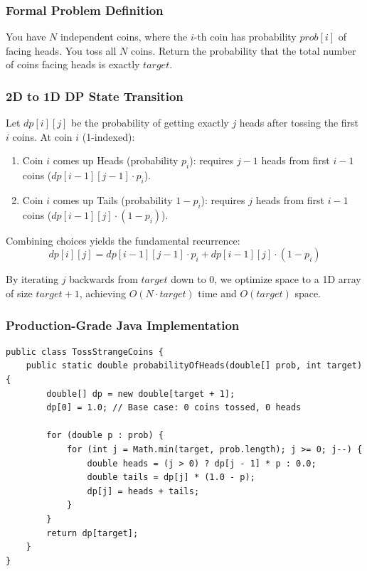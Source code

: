 \documentclass[10pt,journal,compsoc,onecolumn]{IEEEtran}
\begin{document}
\subsubsection{Formal Problem Definition}
You have $N$ independent coins, where the $i$-th coin has probability $prob[i]$ of facing heads. You toss all $N$ coins. Return the probability that the total number of coins facing heads is exactly $target$.

\subsubsection{2D to 1D DP State Transition}
Let $dp[i][j]$ be the probability of getting exactly $j$ heads after tossing the first $i$ coins.
At coin $i$ (1-indexed):
\begin{enumerate}
    \item Coin $i$ comes up Heads (probability $p_i$): requires $j-1$ heads from first $i-1$ coins ($dp[i-1][j-1] \cdot p_i$).
    \item Coin $i$ comes up Tails (probability $1 - p_i$): requires $j$ heads from first $i-1$ coins ($dp[i-1][j] \cdot (1 - p_i)$).
\end{enumerate}

Combining choices yields the fundamental recurrence:
\begin{equation}
dp[i][j] = dp[i-1][j-1] \cdot p_i + dp[i-1][j] \cdot (1 - p_i)
\label{eq:strange-coins-rec}
\end{equation}

By iterating $j$ backwards from $target$ down to 0, we optimize space to a 1D array of size $target + 1$, achieving $O(N \cdot target)$ time and $O(target)$ space.

\subsubsection{Production-Grade Java Implementation}

\begin{verbatim}
public class TossStrangeCoins {
    public static double probabilityOfHeads(double[] prob, int target) {
        double[] dp = new double[target + 1];
        dp[0] = 1.0; // Base case: 0 coins tossed, 0 heads

        for (double p : prob) {
            for (int j = Math.min(target, prob.length); j >= 0; j--) {
                double heads = (j > 0) ? dp[j - 1] * p : 0.0;
                double tails = dp[j] * (1.0 - p);
                dp[j] = heads + tails;
            }
        }
        return dp[target];
    }
}
\end{verbatim}
\end{document}
